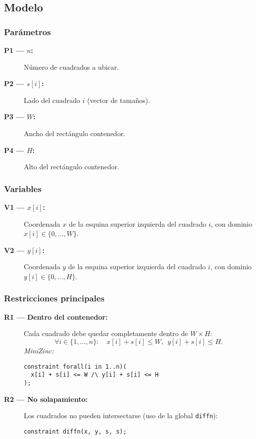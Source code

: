 
\subsection{Modelo}\label{sec:06-rectangulo-modelo}

\subsubsection*{Parámetros}
\begin{description}
  \item[\textbf{P1 — \(n\):}] Número de cuadrados a ubicar.
  \item[\textbf{P2 — \(s[i]\):}] Lado del cuadrado \(i\) (vector de tamaños).
  \item[\textbf{P3 — \(W\):}] Ancho del rectángulo contenedor.
  \item[\textbf{P4 — \(H\):}] Alto del rectángulo contenedor.
\end{description}

\subsubsection*{Variables}
\begin{description}
  \item[\textbf{V1 — \(x[i]\):}] Coordenada \(x\) de la esquina superior izquierda del cuadrado \(i\), con dominio \(x[i]\in\{0,\dots,W\}\).
  \item[\textbf{V2 — \(y[i]\):}] Coordenada \(y\) de la esquina superior izquierda del cuadrado \(i\), con dominio \(y[i]\in\{0,\dots,H\}\).
\end{description}

\subsubsection*{Restricciones principales}
\begin{description}
  \item[\textbf{R1 — Dentro del contenedor:}] Cada cuadrado debe quedar completamente dentro de \(W\times H\):
  \[
  \forall i\in\{1,\dots,n\}:\quad x[i]+s[i]\le W,\ \ y[i]+s[i]\le H.
  \]
  \textit{MiniZinc:}
\begin{verbatim}
constraint forall(i in 1..n)(
  x[i] + s[i] <= W /\ y[i] + s[i] <= H
);
\end{verbatim}

  \item[\textbf{R2 — No solapamiento:}] Los cuadrados no pueden intersectarse (uso de la global \texttt{diffn}):
\begin{verbatim}
constraint diffn(x, y, s, s);
\end{verbatim}
\end{description}

